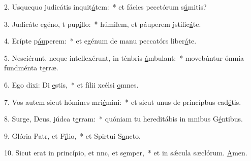 2. Usquequo judicátis inquit\uline{á}tem:~* et fácies pecctórum s\uline{ú}mitis?\par 
3. Judicáte egéno, t pup\uline{í}llo:~* húmilem, et páuperem jstific\uline{á}te.\par 
4. Erípte p\uline{áu}perem:~* et egénum de manu peccatórs liber\uline{á}te.\par 
5. Nesciérunt, neque intellexérunt, in ténbris \uline{á}mbulant:~* movebúntur ómnia fundménta t\uline{e}rræ.\par 
6. Ego dixi: Di \uline{e}stis,~* et fílii xcélsi \uline{o}mnes.\par 
7. Vos autem sicut hómines mri\uline{é}mini:~* et sicut unus de princípbus cad\uline{é}tis.\par 
8. Surge, Deus, júdca t\uline{e}rram:~* quóniam tu hereditábis in mnibus G\uline{é}ntibus.\par 
9. Glória Patr, et F\uline{í}lio,~* et Spirtui S\uline{a}ncto.\par 
10. Sicut erat in princípio, et nnc, et s\uline{e}mper,~* et in sǽcula sæclórum. \uline{A}men.\par 
